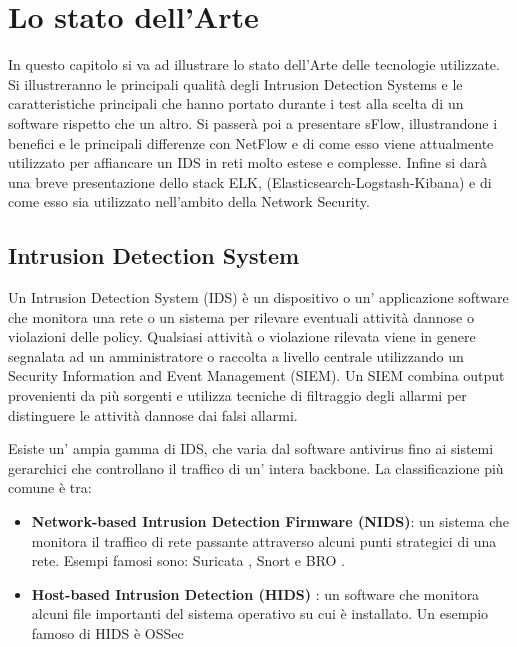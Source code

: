 \documentclass[12pt,a4paper,openright,twoside]{report}
\begin{document}
\chapter{Lo stato dell'Arte}                %
\lhead[\fancyplain{}{\bfseries\thepage}]{\fancyplain{}{\bfseries\rightmark}}
In questo capitolo si va ad illustrare lo stato dell'Arte delle tecnologie utilizzate.
Si illustreranno le principali qualit\`a degli Intrusion Detection Systems e le caratteristiche
principali che hanno portato durante i test alla scelta di un software rispetto che un altro.
Si passer\`a poi a presentare sFlow, illustrandone i benefici e le principali differenze
con NetFlow e di come esso viene attualmente utilizzato per affiancare un IDS in reti
molto estese e complesse.
Infine si dar\`a una breve presentazione dello stack ELK, (Elasticsearch-Logstash-Kibana)
e di come esso sia utilizzato nell'ambito della Network Security.
\section{Intrusion Detection System}
Un Intrusion Detection System (IDS) \cite{K4} \`e un dispositivo o un' applicazione software
che monitora una rete o un sistema per rilevare eventuali attivit\`a dannose o violazioni
delle policy. Qualsiasi attivit\`a o violazione rilevata viene in genere segnalata
ad un amministratore o raccolta a livello centrale utilizzando un
Security Information and Event Management (SIEM).
Un SIEM combina output provenienti da pi\`u sorgenti e utilizza tecniche di filtraggio
degli allarmi per distinguere le attivit\`a dannose dai falsi allarmi.

Esiste un' ampia gamma di IDS, che varia dal software antivirus fino ai sistemi gerarchici
che controllano il traffico di un' intera backbone. La classificazione pi\`u comune
\`e tra:
\begin{itemize}
  \item {\bf Network-based Intrusion Detection Firmware (NIDS)}: un sistema
  che monitora il traffico di rete passante attraverso alcuni punti strategici di una
  rete. Esempi famosi sono: Suricata \cite{K6} , Snort \cite{K7} e BRO \cite{K8} .
  \item {\bf Host-based Intrusion Detection (HIDS)} : un software che monitora
  alcuni file importanti del sistema operativo su cui \`e installato. Un esempio famoso
  di HIDS \`e OSSec \cite{K5}
\end{itemize}
\end{document}
